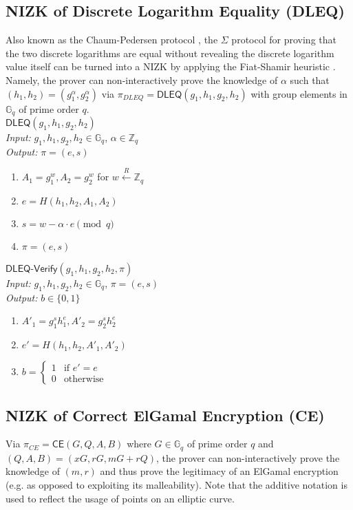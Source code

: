 \documentclass[letterpaper,twocolumn,10pt]{article}
\theoremstyle{definition}
\theoremstyle{remark}
\begin{document}
\subsection{NIZK of Discrete Logarithm Equality (DLEQ)}
\label{appendix:dleq}
Also known as the Chaum-Pedersen protocol \cite{chaum1992wallet}, the $\Sigma$ protocol for proving that the two discrete logarithms are equal without revealing the discrete logarithm value itself can be turned into a NIZK by applying the Fiat-Shamir heuristic \cite{fiat1986prove}. Namely, the prover can non-interactively prove the knowledge of $\alpha$ such that $(h_1, h_2) = (g_1^\alpha, g_2^\alpha)$ via $\pi_{DLEQ} = \mathsf{DLEQ}(g_1, h_1, g_2, h_2)$ with group elements in $\mathbb{G}_q$ of prime order $q$.\\

\noindent\underline{$\mathsf{DLEQ}(g_1, h_1, g_2, h_2)$}\\
\textit{Input:} $g_1, h_1, g_2, h_2 \in \mathbb{G}_q$, $\alpha \in \mathbb{Z}_q$\\
\textit{Output:} $\pi = (e, s)$
\begin{enumerate}
\item $A_1 = g_1^w, A_2 = g_2^w$ for $w \xleftarrow{R} \mathbb{Z}_q$
\item $e = H(h_1, h_2, A_1, A_2)$
\item $s = w - \alpha \cdot e \pmod q$
\item $\pi = (e, s)$
\end{enumerate}

\noindent\underline{$\mathsf{DLEQ}\text{-}\mathsf{Verify}(g_1, h_1, g_2, h_2, \pi)$}\\
\textit{Input:} $g_1, h_1, g_2, h_2 \in \mathbb{G}_q$, $\pi = (e, s)$\\
\textit{Output:} $b \in \{0, 1\}$
\begin{enumerate}
\item $A'_1 = g_1^s h_1^e, A'_2 = g_2^s h_2^e$
\item $e' = H(h_1, h_2, A'_1, A'_2)$
\item $b = \begin{cases}
1 & \text{if $e' = e$}\\
0 & \text{otherwise}
\end{cases}$
\end{enumerate}

\subsection{NIZK of Correct ElGamal Encryption (CE)}
\label{appendix:ce}
Via $\pi_{CE} = \mathsf{CE}(G, Q, A, B)$ \cite{cherniaeva2019homomorphic} where $G \in \mathbb{G}_q$ of prime order $q$ and $(Q, A, B) = (x G, r G, m G + r Q)$, the prover can non-interactively prove the knowledge of $(m, r)$ and thus prove the legitimacy of an ElGamal encryption (e.g. as opposed to exploiting its malleability). Note that the additive notation is used to reflect the usage of points on an elliptic curve.\\
\end{document}
